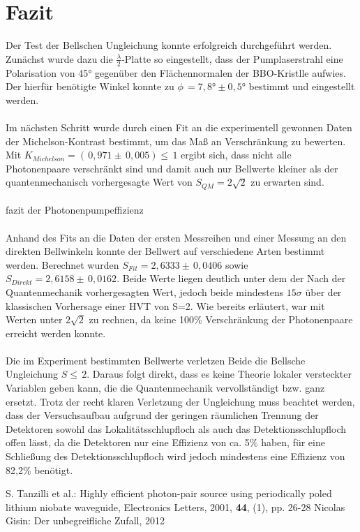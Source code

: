 \documentclass[twoside,colorback,accentcolor=tud4c,11pt]{tudreport}
\begin{document}
\chapter{Fazit}	
Der Test der Bellschen Ungleichung konnte erfolgreich durchgeführt werden. Zunächst wurde dazu die $\frac{\lambda}{2}$-Platte so eingestellt, dass der Pumplaserstrahl eine Polarisation von 45° gegenüber den Flächennormalen der BBO-Kristlle aufwies. Der hierfür benötigte Winkel konnte zu $\phi\,=7,8°\pm0,5°$ bestimmt und eingestellt werden. \\
\\ Im nächsten Schritt wurde durch einen Fit an die experimentell gewonnen Daten der Michelson-Kontrast bestimmt, um das Maß an Verschränkung zu bewerten. Mit $K_{Michelson}=\left(\,0,971\pm\,0,005\right)\leq\,1$ ergibt sich, dass nicht alle Photonenpaare verschränkt sind und damit auch nur Bellwerte kleiner als der quantenmechanisch vorhergesagte Wert von $S_{QM}=2\sqrt{2}$ zu erwarten sind. \\
\\ fazit der Photonenpumpeffizienz \\
\\ Anhand des Fits an die Daten der ersten Messreihen und einer Messung an den direkten Bellwinkeln konnte der Bellwert auf verschiedene Arten bestimmt werden. Berechnet wurden $S_{Fit}=2,6333\pm\,0,0406$ sowie $S_{Direkt}=2,6158\pm\,0,0162$. Beide Werte liegen deutlich unter dem der Nach der Quantenmechanik vorhergesagten Wert, jedoch beide mindestens $15\sigma$ über der klassischen Vorhersage einer HVT von S=2.
Wie bereits erläutert, war mit Werten unter $2\sqrt{2}$ zu rechnen, da keine 100\% Verschränkung der Photonenpaare erreicht werden konnte.\\
\\ Die im Experiment bestimmten Bellwerte verletzen Beide die Bellsche Ungleichung $S\leq\,2$. Daraus folgt direkt, dass es keine Theorie lokaler versteckter Variablen geben kann, die die Quantenmechanik vervollständigt bzw. ganz ersetzt. Trotz der recht klaren Verletzung der Ungleichung muss beachtet werden, dass der Versuchsaufbau aufgrund der geringen räumlichen Trennung der Detektoren sowohl das Lokalitätsschlupfloch als auch das Detektionsschlupfloch offen lässt, da die Detektoren nur eine Effizienz von ca. 5\% haben, für eine Schließung des Detektionsschlupfloch wird jedoch mindestens eine Effizienz von 82,2\% benötigt.
\renewcommand{\bibname}{Literatur}
\begin{thebibliography}{0}
 S. Tanzilli et al.: Highly efficient photon-pair source using periodically poled lithium niobate waveguide, Electronics Letters, 2001, \textbf{44}, (1), pp. 26-28
 Nicolas Gisin: Der unbegreifliche Zufall, 2012
\end{thebibliography}
\end{document}
